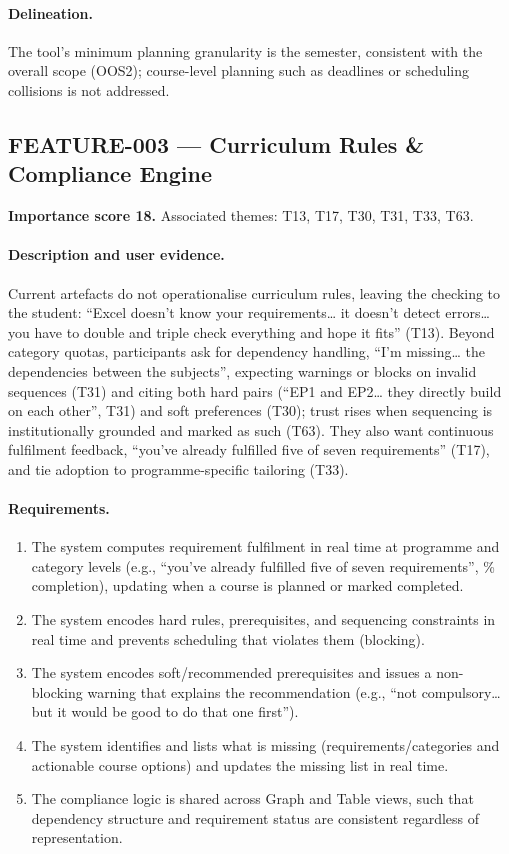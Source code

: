 \paragraph{Delineation.}
The tool's minimum planning granularity is the semester, consistent with the overall scope (OOS2); course-level planning such as deadlines or scheduling collisions is not addressed.

\subsection{FEATURE-003 --- Curriculum Rules \& Compliance Engine}
\label{feat:003}
\textbf{Importance score 18.} Associated themes: T13, T17, T30, T31, T33, T63.

\paragraph{Description and user evidence.}
Current artefacts do not operationalise curriculum rules, leaving the checking to the student: \enquote{Excel doesn't know your requirements… it doesn't detect errors… you have to double and triple check everything and hope it fits} (T13). Beyond category quotas, participants ask for dependency handling, \enquote{I'm missing… the dependencies between the subjects}, expecting warnings or blocks on invalid sequences (T31) and citing both hard pairs (\enquote{EP1 and EP2… they directly build on each other}, T31) and soft preferences (T30); trust rises when sequencing is institutionally grounded and marked as such (T63). They also want continuous fulfilment feedback, \enquote{you've already fulfilled five of seven requirements} (T17), and tie adoption to programme-specific tailoring (T33).

\paragraph{Requirements.}
\begin{enumerate}
    \item The system computes requirement fulfilment in real time at programme and category levels (e.g., \enquote{you've already fulfilled five of seven requirements}, \% completion), updating when a course is planned or marked completed.
    \item The system encodes hard rules, prerequisites, and sequencing constraints in real time and prevents scheduling that violates them (blocking).
    \item The system encodes soft/recommended prerequisites and issues a non-blocking warning that explains the recommendation (e.g., \enquote{not compulsory… but it would be good to do that one first}).
    \item The system identifies and lists what is missing (requirements/categories and actionable course options) and updates the missing list in real time.
    \item The compliance logic is shared across Graph and Table views, such that dependency structure and requirement status are consistent regardless of representation.
\end{enumerate}

